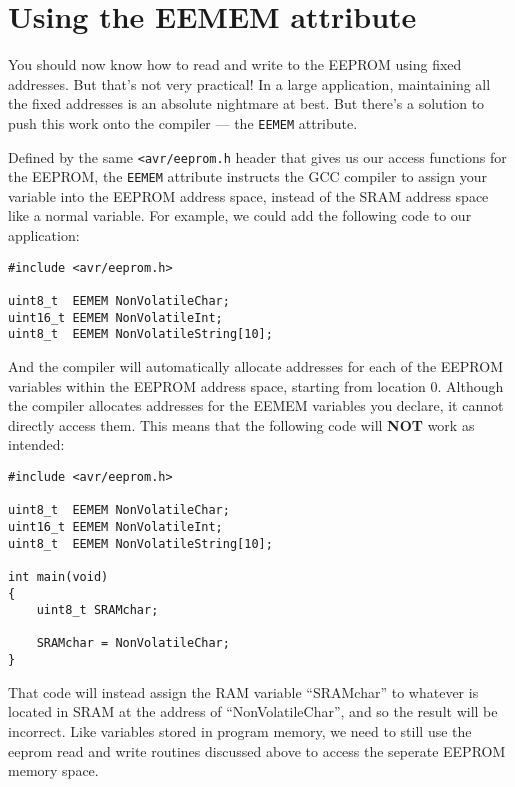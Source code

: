 \documentclass[a4paper,oneside,notitlepage]{book}
\begin{document}
\chapter{Using the EEMEM attribute}

You should now know how to read and write to the EEPROM using fixed addresses. But that's not very practical! In a large application, maintaining all the fixed addresses is an absolute nightmare at best. But there's a solution to push this work onto the compiler --- the \lstinline{EEMEM} attribute.

Defined by the same \lstinline{<avr/eeprom.h} header that gives us our access functions for the EEPROM, the \lstinline{EEMEM} attribute instructs the GCC compiler to assign your variable into the EEPROM address space, instead of the SRAM address space like a normal variable. For example, we could add the following code to our application:

\begin{center}
\begin{lstlisting}
#include <avr/eeprom.h>

uint8_t  EEMEM NonVolatileChar;
uint16_t EEMEM NonVolatileInt;
uint8_t  EEMEM NonVolatileString[10];
\end{lstlisting}
\end{center}

And the compiler will automatically allocate addresses for each of the EEPROM variables within the EEPROM address space, starting from location 0. Although the compiler allocates addresses for the EEMEM variables you declare, it cannot directly access them. This means that the following code will \textbf{NOT} work as intended:

\begin{center}
\begin{lstlisting}
#include <avr/eeprom.h>

uint8_t  EEMEM NonVolatileChar;
uint16_t EEMEM NonVolatileInt;
uint8_t  EEMEM NonVolatileString[10];

int main(void)
{
    uint8_t SRAMchar;

    SRAMchar = NonVolatileChar;
}
\end{lstlisting}
\end{center}

That code will instead assign the RAM variable ``SRAMchar'' to whatever is located in SRAM at the address of ``NonVolatileChar'', and so the result will be incorrect. Like variables stored in program memory, we need to still use the eeprom read and write routines discussed above to access the seperate EEPROM memory space.
\end{document}
